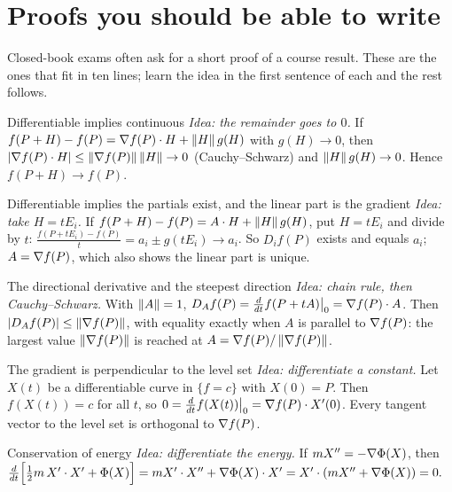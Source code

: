 \section{Proofs you should be able to write}

Closed-book exams often ask for a short proof of a course result. These are the ones that fit in
ten lines; learn the idea in the first sentence of each and the rest follows.

\begin{proofbox}{Differentiable implies continuous}
\emph{Idea: the remainder goes to $0$.} If $f(P+H)-f(P)=\nabla f(P)\cdot H+\left\lVert H\right\rVert g(H)$ with
$g(H)\to0$, then $|\nabla f(P)\cdot H|\le\left\lVert \nabla f(P)\right\rVert\left\lVert H\right\rVert\to0$ (Cauchy--Schwarz) and
$\left\lVert H\right\rVert g(H)\to0$. Hence $f(P+H)\to f(P)$.
\end{proofbox}

\begin{proofbox}{Differentiable implies the partials exist, and the linear part is the gradient}
\emph{Idea: take $H=tE_i$.} If $f(P+H)-f(P)=A\cdot H+\left\lVert H\right\rVert g(H)$, put $H=tE_i$ and divide by $t$:
$\frac{f(P+tE_i)-f(P)}t=a_i\pm g(tE_i)\to a_i$. So $D_if(P)$ exists and equals $a_i$; $A=\nabla f(P)$,
which also shows the linear part is unique.
\end{proofbox}

\begin{proofbox}{The directional derivative and the steepest direction}
\emph{Idea: chain rule, then Cauchy--Schwarz.} With $\left\lVert A\right\rVert=1$, $D_Af(P)=\frac{d}{dt}f(P+tA)\big|_0=\nabla f(P)\cdot A$.
Then $|D_Af(P)|\le\left\lVert \nabla f(P)\right\rVert$, with equality exactly when $A$ is parallel to $\nabla f(P)$:
the largest value $\left\lVert \nabla f(P)\right\rVert$ is reached at $A=\nabla f(P)/\left\lVert \nabla f(P)\right\rVert$.
\end{proofbox}

\begin{proofbox}{The gradient is perpendicular to the level set}
\emph{Idea: differentiate a constant.} Let $X(t)$ be a differentiable curve in $\{f=c\}$ with
$X(0)=P$. Then $f(X(t))=c$ for all $t$, so $0=\frac{d}{dt}f(X(t))\big|_0=\nabla f(P)\cdot X'(0)$. Every
tangent vector to the level set is orthogonal to $\nabla f(P)$.
\end{proofbox}

\begin{proofbox}{Conservation of energy}
\emph{Idea: differentiate the energy.} If $mX''=-\nabla\Phi(X)$, then
$\frac{d}{dt}\Big[\tfrac12m\,X'\cdot X'+\Phi(X)\Big]=mX'\cdot X''+\nabla\Phi(X)\cdot X'=X'\cdot(mX''+\nabla\Phi(X))=0.$
\end{proofbox}

